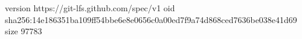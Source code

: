 version https://git-lfs.github.com/spec/v1
oid sha256:14e186351ba109ff54bbe6e8e0656c0a00ed7f9a74d868ced7636be038e41d69
size 97783
